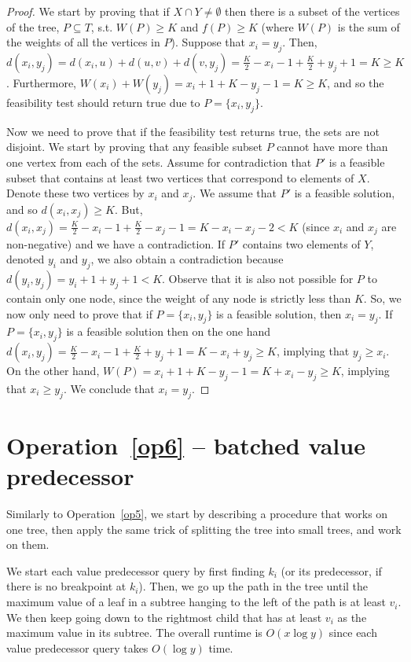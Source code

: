 \documentclass[a4paper,UKenglish]{lipics-v2016}
\theoremstyle{plain}
\begin{document}
\begin{proof}
We start by proving that if $X \cap Y \neq \emptyset$ then there is a subset of the vertices of the tree, $P \subseteq T$, s.t. $W(P) \geq K$ and $f(P) \geq K$ (where $W(P)$ is the sum of the weights of all the vertices in $P$). Suppose that  $x_i=y_j$. Then, $d(x_i,y_j) = d(x_i,u) + d(u,v) + d(v,y_j) = \frac{K}{2} - x_i -1 + \frac{K}{2} + y_j +1 = K \geq K$. Furthermore, $W(x_i) + W(y_j) = x_i + 1 + K- y_j -1 = K \geq K$, and so the feasibility test should return true due to $P = \lbrace x_i, y_j \rbrace$.

Now we need to prove that if the feasibility test returns true, the sets are not disjoint.
We start by proving that any feasible subset $P$ cannot have more than one vertex from each of the sets.
Assume for contradiction that $P'$ is a feasible subset that contains at least two vertices that correspond to elements of $X$. Denote these two vertices by $x_i$ and $x_j$. We assume that $P'$ is a feasible solution, and so $d(x_i,x_j) \geq K$. But, $d(x_i,x_j) = \frac{K}{2} - x_i -1 + \frac{K}{2} - x_j -1 = K - x_i - x_j -2 < K$ (since $x_i$ and $x_j$ are non-negative) and we have a contradiction.
If $P'$ contains two elements of $Y$, denoted $y_{i}$ and $y_{j}$, we also obtain a contradiction because
$d(y_{i},y_{j})=y_{i}+1+y_{j}+1<K$.
Observe that it is also not possible for $P$ to contain only one node, since the weight of any node is strictly less than $K$. So, we now only need to prove that if $P= \{ x_i,y_j \}$ is a feasible solution, then $x_i = y_j$.
If $P= \{ x_i,y_j \}$ is a feasible solution then on the one hand $d(x_i,y_j) = \frac{K}{2} - x_i -1 + \frac{K}{2} + y_j +1 = K - x_i + y_j \geq K$, implying that $y_j \geq x_i$. On the other hand, $W(P) = x_i + 1 + K - y_j -1 = K + x_i - y_j \geq K$, implying that $x_i \geq y_j$. We conclude that $x_i = y_j$.
\end{proof}

\section{Operation~\ref{op6} -- batched value predecessor}\label{appendix batched value predecessor}
Similarly to Operation~\ref{op5}, we start by describing a procedure that works on one tree, then apply the same trick of splitting the tree into small trees, and work on them.

We start each value predecessor query by first finding $k_i$ (or its predecessor, if there is no breakpoint at $k_i$). Then, we go up the path in the tree until the maximum value of a leaf in a subtree hanging to the left of the path is at least $v_i$. We then keep going down to the rightmost child that has at least $v_i$ as the maximum value in its subtree. The overall runtime is $O(x \log y)$ since each value predecessor query takes $O(\log y)$ time.
\end{document}
